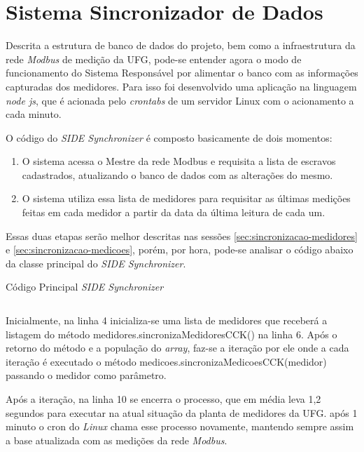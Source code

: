 \chapter{Sistema Sincronizador de Dados}
\label{c:sistema_sincronizador_de_dados}
Descrita a estrutura de banco de dados do projeto, bem como a infraestrutura da rede \textit{Modbus} de medição da UFG, pode-se entender agora o modo de funcionamento do Sistema Responsável por alimentar o banco com as informações capturadas dos medidores. Para isso foi desenvolvido uma aplicação na linguagem \textit{node js}, que é acionada pelo \textit{crontabs} de um servidor Linux com o acionamento a cada minuto.

O código do \textit{SIDE Synchronizer} é composto basicamente de dois momentos:

\begin{enumerate}
    \item O sistema acessa o Mestre da rede Modbus e requisita a lista de escravos cadastrados, atualizando o banco de dados com as alterações do mesmo.
    \item O sistema utiliza essa lista de medidores para requisitar as últimas medições feitas em cada medidor a partir da data da última leitura de cada um.
\end{enumerate}

Essas duas etapas serão melhor descritas nas sessões \ref{sec:sincronizacao-medidores} e \ref{sec:sincronizacao-medicoes}, porém, por hora, pode-se analisar o código abaixo da classe principal do \textit{SIDE Synchronizer}.

\begin{listing}[ht]

\label{listing:sidesynchronizer}
\caption{Código Principal \textit{SIDE Synchronizer}}
\inputminted[frame=lines, 
    framesep=5mm, fontsize=\footnotesize, linenos=true, label={sidesynchronizer.js}]{js}{codigos/sidesynchronizer.js}
\end{listing}

Inicialmente, na linha 4 inicializa-se uma lista de medidores que receberá a listagem do método medidores.sincronizaMedidoresCCK() na linha 6. Após o retorno do método e a população do \textit{array}, faz-se a iteração por ele onde a cada iteração é executado o método medicoes.sincronizaMedicoesCCK(medidor) passando o medidor como parâmetro.

\newpage
Após a iteração, na linha 10 se encerra o processo, que em média leva 1,2 segundos para executar na atual situação da planta de medidores da UFG. após 1 minuto o cron do \textit{Linux} chama esse processo novamente, mantendo sempre assim a base atualizada com as medições da rede \textit{Modbus}.

